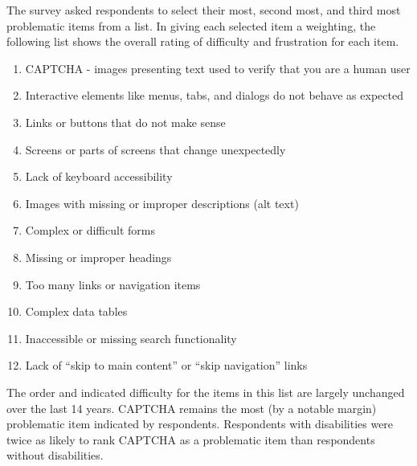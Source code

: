 The survey asked respondents to select their most, second most, and third most problematic items from a list. In giving each selected item a weighting, the following list shows the overall rating of difficulty and frustration for each item.

\begin{enumerate}
    \item CAPTCHA - images presenting text used to verify that you are a human user
    \item Interactive elements like menus, tabs, and dialogs do not behave as expected
    \item Links or buttons that do not make sense
    \item Screens or parts of screens that change unexpectedly
    \item Lack of keyboard accessibility
    \item Images with missing or improper descriptions (alt text)
    \item Complex or difficult forms
    \item Missing or improper headings
    \item Too many links or navigation items
    \item Complex data tables
    \item Inaccessible or missing search functionality
    \item Lack of ``skip to main content'' or ``skip navigation'' links
\end{enumerate}

The order and indicated difficulty for the items in this list are largely unchanged over the last 14 years. CAPTCHA remains the most (by a notable margin) problematic item indicated by respondents. Respondents with disabilities were twice as likely to rank CAPTCHA as a problematic item than respondents without disabilities.

